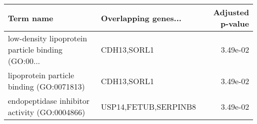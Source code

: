 \begin{tabular}{llr}
\toprule
                                         Term name & Overlapping genes... &  Adjusted p-value \\
\midrule
low-density lipoprotein particle binding (GO:00... &          CDH13,SORL1 &          3.49e-02 \\
         lipoprotein particle binding (GO:0071813) &          CDH13,SORL1 &          3.49e-02 \\
     endopeptidase inhibitor activity (GO:0004866) & USP14,FETUB,SERPINB8 &          3.49e-02 \\
\bottomrule
\end{tabular}
